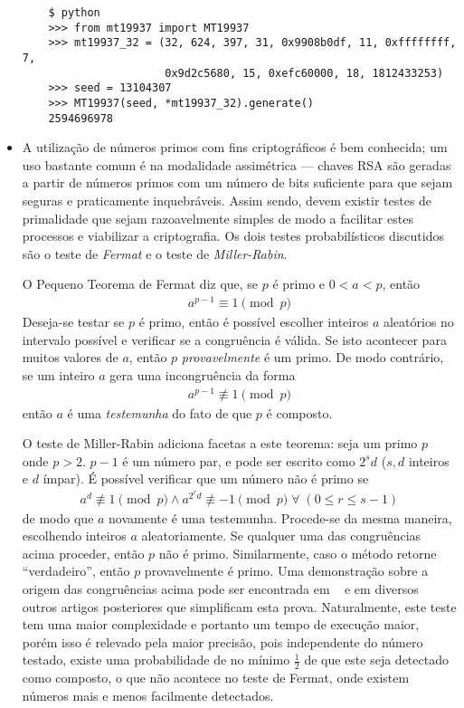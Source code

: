 \documentclass{../sftex/sftex}
\begin{document}
\begin{itemize}
\begin{verbatim}
    $ python
    >>> from mt19937 import MT19937
    >>> mt19937_32 = (32, 624, 397, 31, 0x9908b0df, 11, 0xffffffff, 7,
                      0x9d2c5680, 15, 0xefc60000, 18, 1812433253)
    >>> seed = 13104307
    >>> MT19937(seed, *mt19937_32).generate()
    2594696978
\end{verbatim}

\item A utilização de números primos com fins criptográficos é bem conhecida;
um uso bastante comum é na modalidade assimétrica --- chaves RSA são geradas a
partir de números primos com um número de bits suficiente para que sejam
seguras e praticamente inquebráveis. Assim sendo, devem existir testes de
primalidade que sejam razoavelmente simples de modo a facilitar estes
processos e viabilizar a criptografia. Os dois testes probabilísticos
discutidos são o teste de \emph{Fermat} e o teste de \emph{Miller-Rabin}.

O Pequeno Teorema de Fermat diz que, se $p$ é primo e $0 < a < p$, então
\begin{align*}
a^{p-1} \equiv 1 \pmod{p}
\end{align*}
Deseja-se testar se $p$ é primo, então é possível escolher inteiros $a$
aleatórios no intervalo possível e verificar se a congruência é válida. Se
isto acontecer para muitos valores de $a$, então $p$ \emph{provavelmente} é um
primo. De modo contrário, se um inteiro $a$ gera uma incongruência da forma
\begin{align*}a^{p-1} \not\equiv 1 \pmod{p}\end{align*}
então $a$ é uma \emph{testemunha} do fato de que $p$ é composto.

O teste de Miller-Rabin adiciona facetas a este teorema: seja um primo $p$
onde $p > 2$. $p - 1$ é um número par, e pode ser escrito como $2^s d$ ($s,
d$ inteiros e $d$ ímpar). É possível verificar que um número não é primo se
\begin{align*}
a^d \not\equiv 1 \pmod{p} \land
a^{2^{r}d} \not\equiv -1 \pmod{p} \; \forall \; (0 \leq r \leq s-1)
\end{align*}
de modo que $a$ novamente é uma testemunha. Procede-se da mesma maneira,
escolhendo inteiros $a$ aleatoriamente. Se qualquer uma das congruências acima
proceder, então $p$ não é primo. Similarmente, caso o método retorne
``verdadeiro'', então $p$ provavelmente é primo. Uma demonstração sobre a
origem das congruências acima pode ser encontrada em
~\cite{Miller:1976:RHT:1739937.1740086} e em diversos outros artigos
posteriores que simplificam esta prova. Naturalmente, este teste tem uma
maior complexidade e portanto um tempo de execução maior, porém isso é
relevado pela maior precisão, pois independente do número testado, existe
uma probabilidade de no mínimo $\frac{1}{2}$ de que este seja detectado como
composto, o que não acontece no teste de Fermat, onde existem números
mais e menos facilmente detectados.


\end{itemize}
\end{document}
